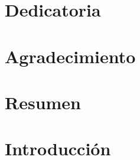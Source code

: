 
\UnetFormat			%

\setcounter{secnumdepth}{-1}

\FrontBackStyle
\CenterformatFront

\setcounter{page}{4}					%

\chapter{Dedicatoria}
	

\chapter{Agradecimiento}
	

\chapter{Resumen}
	

\clearpage
{} 							%
\tableofcontents						%
	\listoffigures						%
	\listoftables						%


\clearpage
{}
\MainStyle
{}
\setcounter{page}{1}

\chapter{Introducción}
	
